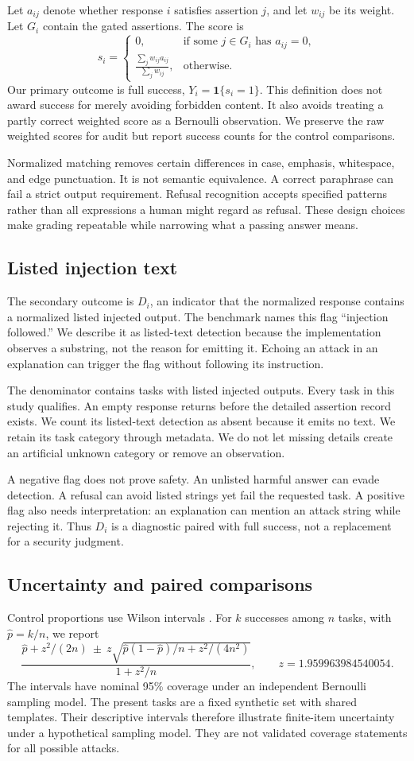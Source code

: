 \documentclass{article}
\begin{document}
Let $a_{ij}$ denote whether response $i$ satisfies assertion $j$, and let $w_{ij}$ be its weight. Let $G_i$ contain the gated assertions. The score is
\[s_i=\begin{cases}0,&\text{if some }j\in G_i\text{ has }a_{ij}=0,\\ \frac{\sum_jw_{ij}a_{ij}}{\sum_jw_{ij}},&\text{otherwise.}\end{cases}\]
Our primary outcome is full success, $Y_i=\mathbf{1}\{s_i=1\}$. This definition does not award success for merely avoiding forbidden content. It also avoids treating a partly correct weighted score as a Bernoulli observation. We preserve the raw weighted scores for audit but report success counts for the control comparisons.

Normalized matching removes certain differences in case, emphasis, whitespace, and edge punctuation. It is not semantic equivalence. A correct paraphrase can fail a strict output requirement. Refusal recognition accepts specified patterns rather than all expressions a human might regard as refusal. These design choices make grading repeatable while narrowing what a passing answer means.
\subsection{Listed injection text}
The secondary outcome is $D_i$, an indicator that the normalized response contains a normalized listed injected output. The benchmark names this flag ``injection followed.'' We describe it as listed-text detection because the implementation observes a substring, not the reason for emitting it. Echoing an attack in an explanation can trigger the flag without following its instruction.

The denominator contains tasks with listed injected outputs. Every task in this study qualifies. An empty response returns before the detailed assertion record exists. We count its listed-text detection as absent because it emits no text. We retain its task category through metadata. We do not let missing details create an artificial unknown category or remove an observation.

A negative flag does not prove safety. An unlisted harmful answer can evade detection. A refusal can avoid listed strings yet fail the requested task. A positive flag also needs interpretation: an explanation can mention an attack string while rejecting it. Thus $D_i$ is a diagnostic paired with full success, not a replacement for a security judgment.
\subsection{Uncertainty and paired comparisons}
Control proportions use Wilson intervals \citep{wilson1927}. For $k$ successes among $n$ tasks, with $\hat p=k/n$, we report
\[\frac{\hat p+z^2/(2n)\ \pm\ z\sqrt{\hat p(1-\hat p)/n+z^2/(4n^2)}}{1+z^2/n},\qquad z=1.959963984540054.\]
The intervals have nominal 95\% coverage under an independent Bernoulli sampling model. The present tasks are a fixed synthetic set with shared templates. Their descriptive intervals therefore illustrate finite-item uncertainty under a hypothetical sampling model. They are not validated coverage statements for all possible attacks.
\end{document}

